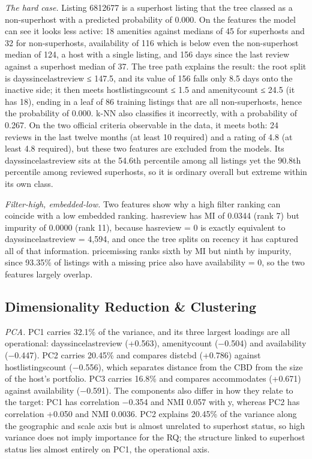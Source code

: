 \documentclass[final,1p,11pt]{elsarticle}
\renewcommand\_{\textunderscore\allowbreak}%
\begin{document}
\textit{The hard case.} Listing 6812677 is a superhost listing that the tree classed as a non-superhost with a predicted probability of 0.000. On the features the model can see it looks less active: 18 amenities against medians of 45 for superhosts and 32 for non-superhosts, availability of 116 which is below even the non-superhost median of 124, a host with a single listing, and 156 days since the last review against a superhost median of 37. The tree path explains the result: the root split is days\_since\_last\_review ≤ 147.5, and its value of 156 falls only 8.5 days onto the inactive side; it then meets host\_listings\_count ≤ 1.5 and amenity\_count ≤ 24.5 (it has 18), ending in a leaf of 86 training listings that are all non-superhosts, hence the probability of 0.000. k-NN also classifies it incorrectly, with a probability of 0.267. On the two official criteria observable in the data, it meets both: 24 reviews in the last twelve months (at least 10 required) and a rating of 4.8 (at least 4.8 required), but these two features are excluded from the models. Its days\_since\_last\_review sits at the 54.6th percentile among all listings yet the 90.8th percentile among reviewed superhosts, so it is ordinary overall but extreme within its own class.

\textit{Filter-high, embedded-low.} Two features show why a high filter ranking can coincide with a low embedded ranking. has\_review has MI of 0.0344 (rank 7) but impurity of 0.0000 (rank 11), because has\_review = 0 is exactly equivalent to days\_since\_last\_review = 4,594, and once the tree splits on recency it has captured all of that information. price\_missing ranks sixth by MI but ninth by impurity, since 93.35\% of listings with a missing price also have availability\_365 = 0, so the two features largely overlap.

\subsection{Dimensionality Reduction \& Clustering}

\textit{PCA.} PC1 carries 32.1\% of the variance, and its three largest loadings are all operational: days\_since\_last\_review (+0.563), amenity\_count (−0.504) and availability\_365 (−0.447). PC2 carries 20.45\% and compares dist\_cbd (+0.786) against host\_listings\_count (−0.556), which separates distance from the CBD from the size of the host's portfolio. PC3 carries 16.8\% and compares accommodates (+0.671) against availability\_365 (−0.591). The components also differ in how they relate to the target: PC1 has correlation −0.354 and NMI 0.057 with y, whereas PC2 has correlation +0.050 and NMI 0.0036. PC2 explains 20.45\% of the variance along the geographic and scale axis but is almost unrelated to superhost status, so high variance does not imply importance for the RQ; the structure linked to superhost status lies almost entirely on PC1, the operational axis.
\end{document}
